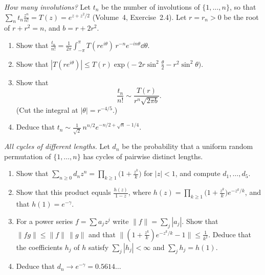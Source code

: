 \begin{exercise}[$\star\star\star$]\label{pb:involasym}
\emph{How many involutions?} Let $t_n$ be the number of involutions of $\{1,\dots,n\}$, so that $\sum_nt_n\frac{z^n}{n!}=T(z)=e^{z+z^2/2}$ (Volume~4,
Exercise~2.4). Let $r=r_n>0$ be the root of $r+r^2=n$, and $b=r+2r^2$.
\begin{enumerate}[label=(\alph*)]
\item Show that $\frac{t_n}{n!}=\frac1{2\pi}\int_{-\pi}^\pi T(re^{i\theta})\,r^{-n}e^{-in\theta}\dd\theta$.
\item Show that $|T(re^{i\theta})|\le T(r)\exp\bigl(-2r\sin^2\frac\theta2-r^2\sin^2\theta\bigr)$.
\item Show that
\[
\frac{t_n}{n!}\sim\frac{T(r)}{r^n\sqrt{2\pi b}}.
\]
(Cut the integral at $|\theta|=r^{-4/5}$.)
\item Deduce that $t_n\sim\frac1{\sqrt2}\,n^{n/2}e^{-n/2+\sqrt n-1/4}$.
\end{enumerate}
\end{exercise}

\begin{exercise}[$\star\star\star$]\label{pb:distinctcycles}
\emph{All cycles of different lengths.} Let $d_n$ be the probability that a uniform random permutation of $\{1,\dots,n\}$ has cycles of pairwise distinct lengths.
\begin{enumerate}[label=(\alph*)]
\item Show that $\sum_{n\ge0}d_nz^n=\prod_{k\ge1}\bigl(1+\frac{z^k}k\bigr)$ for $|z|<1$, and compute $d_1,\dots,d_5$.
\item Show that this product equals $\frac{h(z)}{1-z}$, where $h(z)=\prod_{k\ge1}\bigl(1+\frac{z^k}k\bigr)e^{-z^k/k}$, and that $h(1)=e^{-\gamma}$.
\item For a power series $f=\sum a_jz^j$ write $\|f\|=\sum_j|a_j|$. Show that $\|fg\|\le\|f\|\,\|g\|$ and that $\bigl\|(1+\frac{z^k}k)e^{-z^k/k}-1\bigr\|\le\frac1{k^2}$.
Deduce that the coefficients $h_j$ of $h$ satisfy $\sum_j|h_j|<\infty$ and $\sum_jh_j=h(1)$.
\item Deduce that $d_n\to e^{-\gamma}=0.5614\ldots$
\end{enumerate}
\end{exercise}

